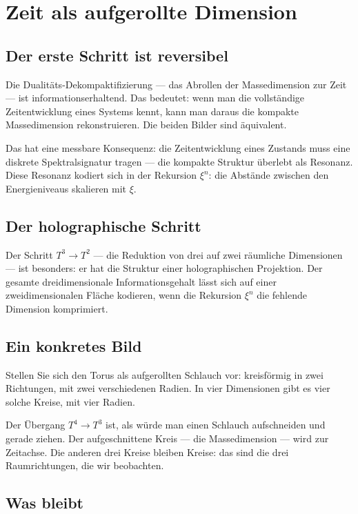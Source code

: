 \documentclass[12pt,oneside]{book}
\begin{document}
\chapter{Zeit als aufgerollte Dimension}

\section{Der erste Schritt ist reversibel}

Die Dualitäts-Dekompaktifizierung — das Abrollen der Massedimension zur Zeit — ist informationserhaltend. Das bedeutet: wenn man die vollständige Zeitentwicklung eines Systems kennt, kann man daraus die kompakte Massedimension rekonstruieren. Die beiden Bilder sind äquivalent.

Das hat eine messbare Konsequenz: die Zeitentwicklung eines Zustands muss eine diskrete Spektralsignatur tragen — die kompakte Struktur überlebt als Resonanz. Diese Resonanz kodiert sich in der Rekursion $\xi^n$: die Abstände zwischen den Energieniveaus skalieren mit $\xi$.

\section{Der holographische Schritt}

Der Schritt $T^3 \to T^2$ — die Reduktion von drei auf zwei räumliche Dimensionen — ist besonders: er hat die Struktur einer holographischen Projektion. Der gesamte dreidimensionale Informationsgehalt lässt sich auf einer zweidimensionalen Fläche kodieren, wenn die Rekursion $\xi^n$ die fehlende Dimension komprimiert.

\section{Ein konkretes Bild}

Stellen Sie sich den Torus als aufgerollten Schlauch vor: kreisförmig in zwei Richtungen, mit zwei verschiedenen Radien. In vier Dimensionen gibt es vier solche Kreise, mit vier Radien.

Der Übergang $T^4 \to T^3$ ist, als würde man einen Schlauch aufschneiden und gerade ziehen. Der aufgeschnittene Kreis — die Massedimension — wird zur Zeitachse. Die anderen drei Kreise bleiben Kreise: das sind die drei Raumrichtungen, die wir beobachten.

\section{Was bleibt}
\end{document}
